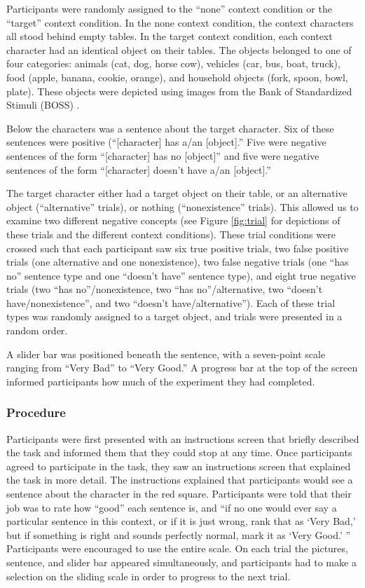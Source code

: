 \documentclass[10pt,letterpaper]{article}
\begin{document}
Participants were randomly assigned to the ``none'' context condition or the ``target'' context condition.  In the none context condition, the context characters all stood behind empty tables.  In the target context condition, each context character had an identical object on their tables.  The objects belonged to one of four categories: animals (cat, dog, horse cow), vehicles (car, bus, boat, truck), food (apple, banana, cookie, orange), and household objects (fork, spoon, bowl, plate).  These objects were depicted using images from the Bank of Standardized Stimuli (BOSS) \cite{brodeur2010}.  

Below the characters was a sentence about the target character.  Six of these sentences were positive (``[character] has a/an [object].''  Five were negative sentences of the form ``[character] has no [object]'' and five were negative sentences of the form ``[character] doesn't have a/an [object].'' 

The target character either had a target object on their table, or an alternative object (``alternative'' trials), or nothing (``nonexistence'' trials).  This allowed us to examine two different negative concepts (see Figure \ref{fig:trial} for depictions of these trials and the different context conditions).    These trial conditions were crossed such that each participant saw six true positive trials, two false positive trials (one alternative and one nonexistence), two false negative trials (one ``has no'' sentence type and one ``doesn't have'' sentence type), and eight true negative trials (two ``has no''/nonexistence, two ``has no''/alternative, two ``doesn't have/nonexistence'', and two ``doesn't have/alternative'').  Each of these trial types was randomly assigned to a target object, and trials were presented in a random order.  

A slider bar was positioned beneath the sentence, with a seven-point scale ranging from ``Very Bad'' to ``Very Good.''  A progress bar at the top of the screen informed participants how much of the experiment they had completed. 

\subsubsection{Procedure}

Participants were first presented with an instructions screen that briefly described the task and informed them that they could stop at any time.  Once participants agreed to participate in the task, they saw an instructions screen that explained the task in more detail.  The instructions explained that participants would see a sentence about the character in the red square.  Participants were told that their job was to rate how ``good'' each sentence is, and ``if no one would ever say a particular sentence in this context, or if it is just wrong, rank that as `Very Bad,' but if something is right and sounds perfectly normal, mark it as `Very Good.' ''  Participants were encouraged to use the entire scale. On each trial the pictures, sentence, and slider bar appeared simultaneously, and participants had to make a selection on the sliding scale in order to progress to the next trial.  
\end{document}
